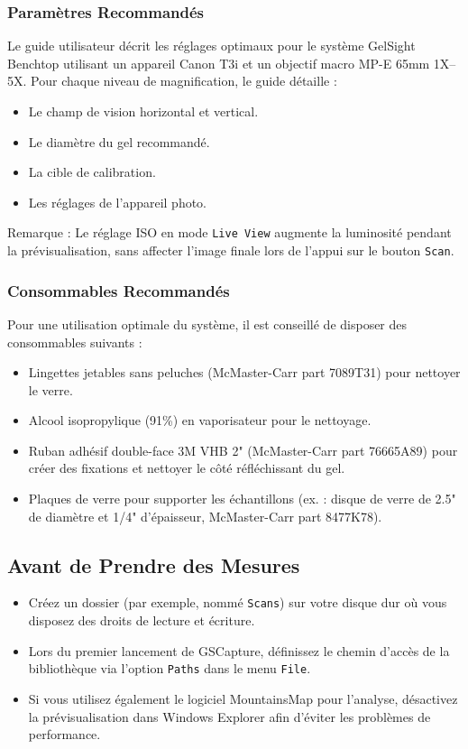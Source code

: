 \documentclass[a4paper,12pt]{article}
\begin{document}
\subsubsection{Paramètres Recommandés}
Le guide utilisateur décrit les réglages optimaux pour le système GelSight Benchtop utilisant un appareil Canon T3i et un objectif macro MP-E 65mm 1X–5X. Pour chaque niveau de magnification, le guide détaille :
\begin{itemize}
  \item Le champ de vision horizontal et vertical.
  \item Le diamètre du gel recommandé.
  \item La cible de calibration.
  \item Les réglages de l'appareil photo.
\end{itemize}
\noindent Remarque : Le réglage ISO en mode \texttt{Live View} augmente la luminosité pendant la prévisualisation, sans affecter l'image finale lors de l'appui sur le bouton \texttt{Scan}.

\subsubsection{Consommables Recommandés}
Pour une utilisation optimale du système, il est conseillé de disposer des consommables suivants :
\begin{itemize}
  \item Lingettes jetables sans peluches (McMaster-Carr part 7089T31) pour nettoyer le verre.
  \item Alcool isopropylique (91\%) en vaporisateur pour le nettoyage.
  \item Ruban adhésif double-face 3M VHB 2" (McMaster-Carr part 76665A89) pour créer des fixations et nettoyer le côté réfléchissant du gel.
  \item Plaques de verre pour supporter les échantillons (ex. : disque de verre de 2.5" de diamètre et 1/4" d'épaisseur, McMaster-Carr part 8477K78).
\end{itemize}

\subsection{Avant de Prendre des Mesures}
\begin{itemize}
  \item Créez un dossier (par exemple, nommé \texttt{Scans}) sur votre disque dur où vous disposez des droits de lecture et écriture.
  \item Lors du premier lancement de GSCapture, définissez le chemin d'accès de la bibliothèque via l'option \texttt{Paths} dans le menu \texttt{File}.
  \item Si vous utilisez également le logiciel MountainsMap pour l'analyse, désactivez la prévisualisation dans Windows Explorer afin d'éviter les problèmes de performance.
\end{itemize}
\end{document}
